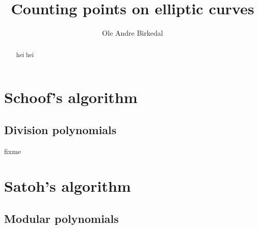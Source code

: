 \documentclass[a4paper,10pt]{amsart}
\title{Counting points on elliptic curves}
\author{Ole Andre Birkedal}
\begin{document}
\newtheorem{thm}{Theorem}
\newtheorem{mydef}{Definition}
\newtheorem{ex}{Example}
\newtheorem{prop}{Proposition}
\newtheorem{lemma}{Lemma}

\begin{abstract}
hei hei
\end{abstract}

\maketitle
\tableofcontents






\section{Schoof's algorithm}
\subsection{Division polynomials}
fixme
\section{Satoh's algorithm}
\subsection{Modular polynomials}
\end{document}
